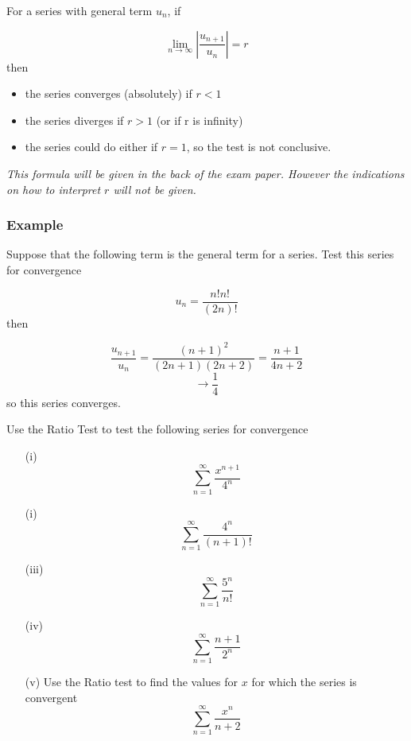 \documentclass[]{article}
\begin{document}
	\begin{framed}
		\noindent For a series with general term $u_n$, if
		
		\[ \lim_{n \to \infty } \left| \frac{u_{n+1}}{u_n} \right| = r\]
		then
		
		\begin{itemize}
			\item the series converges (absolutely) if $r<1$
			\item the series diverges if $r>1$ (or if r is infinity)
			\item the series could do either if $r=1$, so the test is not conclusive.
		\end{itemize}
	\end{framed}
\noindent \textit{This formula will be given in the back of the exam paper. However the indications on how to interpret $r$ will not be given.}
	\begin{framed}
		\subsubsection*{Example}
		Suppose that the following term is the general term for a series. Test this series for convergence
		
		\[u_n=\frac{n!n!}{(2n)!}\]
		then
		
		\[\frac{u_{n+1}}{u_n}=\frac{(n+1)^2}{(2n+1)(2n+2)}=\frac{n+1}{4n+2} \]
		\[ \to \frac{1}{4}\]
		so this series converges.
	\end{framed}
	
	
	
	
	\noindent Use the Ratio Test to test the following series for convergence
	\begin{multicols}{2}
		\begin{itemize}
			\item[(i)] 
			\[\sum^{\infty}_{n=1} \frac{x^{n+1}}{4^n} \]
			\item[(i)] 
			\[\sum^{\infty}_{n=1} \frac{4^n}{(n+1)!} \]
			
			\item[(iii)] \[\sum^{\infty}_{n=1} \frac{5^n }{n!} \]
			
			
			\item[(iv)] \[\sum^{\infty}_{n=1} \frac{n+1}{2^n} \]
			
		\end{itemize}
	\end{multicols}
	
	\begin{itemize}
		\item[(v)] Use the Ratio test to find the values for $x$ for which the series  is convergent
		\[\sum^{\infty}_{n=1} \frac{x^{n} }{n+2} \]
		
	\end{itemize}
	
\end{document}

